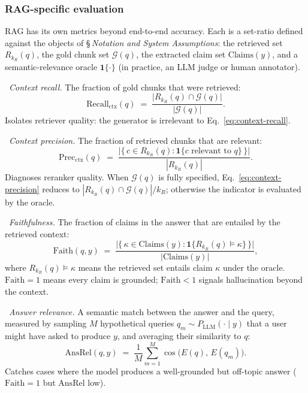 \subsubsection{RAG-specific evaluation}
\label{sec:rag-eval}

RAG has its own metrics beyond end-to-end accuracy. Each is a
set-ratio defined against the objects of
\S\,\emph{Notation and System Assumptions}: the retrieved set
$R_{k_R}(q)$, the gold chunk set $\mathcal{G}(q)$, the extracted claim
set $\mathrm{Claims}(y)$, and a semantic-relevance oracle
$\mathbf{1}\{\cdot\}$ (in practice, an LLM judge or human
annotator).

\Def\ \emph{Context recall.} The fraction of gold chunks that were
retrieved:
\begin{equation}
  \mathrm{Recall}_{\mathrm{ctx}}(q)
  \;=\; \frac{\bigl|R_{k_R}(q) \cap \mathcal{G}(q)\bigr|}
             {|\mathcal{G}(q)|}.
  \label{eq:context-recall}
\end{equation}
Isolates retriever quality: the generator is irrelevant to
Eq.~\eqref{eq:context-recall}.

\Def\ \emph{Context precision.} The fraction of retrieved chunks
that are relevant:
\begin{equation}
  \mathrm{Prec}_{\mathrm{ctx}}(q)
  \;=\; \frac{\bigl|\{\, c \in R_{k_R}(q)
              : \mathbf{1}\{c \text{ relevant to } q\} \,\}\bigr|}
             {|R_{k_R}(q)|}.
  \label{eq:context-precision}
\end{equation}
Diagnoses reranker quality. When $\mathcal{G}(q)$ is fully specified,
Eq.~\eqref{eq:context-precision} reduces to
$|R_{k_R}(q) \cap \mathcal{G}(q)| / k_R$; otherwise the indicator is
evaluated by the oracle.

\Def\ \emph{Faithfulness.} The fraction of claims in the answer
that are entailed by the retrieved context:
\begin{equation}
  \mathrm{Faith}(q, y)
  \;=\; \frac{\bigl|\{\, \kappa \in \mathrm{Claims}(y)
              : \mathbf{1}\{R_{k_R}(q) \vDash \kappa\} \,\}\bigr|}
             {|\mathrm{Claims}(y)|},
  \label{eq:faithfulness}
\end{equation}
where $R_{k_R}(q) \vDash \kappa$ means the retrieved set entails
claim $\kappa$ under the oracle. $\mathrm{Faith} = 1$ means every
claim is grounded; $\mathrm{Faith} < 1$ signals hallucination
beyond the context.

\Def\ \emph{Answer relevance.} A semantic match between the answer
and the query, measured by sampling $M$ hypothetical queries
$q_m \sim P_{\mathrm{LLM}}(\cdot \mid y)$ that a user might have
asked to produce $y$, and averaging their similarity to $q$:
\begin{equation}
  \mathrm{AnsRel}(q, y)
  \;=\; \frac{1}{M} \sum_{m=1}^{M}
        \cos\!\bigl(E(q),\, E(q_m)\bigr).
  \label{eq:answer-relevance}
\end{equation}
Catches cases where the model produces a well-grounded but
off-topic answer ($\mathrm{Faith} = 1$ but $\mathrm{AnsRel}$ low).

